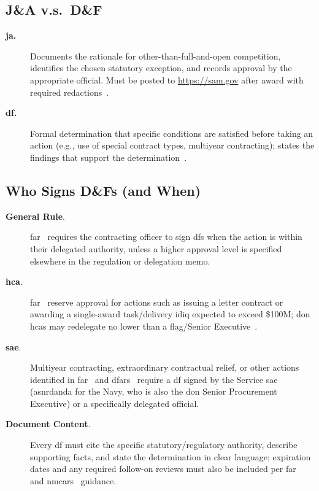 \documentclass[../main.tex]{subfiles}
\begin{document}
\subsection{J\&A v.s.\ D\&F}
\begin{description}
  \item[\textbf{\ac{ja}.}] Documents the rationale for other-than-full-and-open competition, identifies the chosen statutory exception, and records approval by the appropriate official. Must be posted to \url{https://sam.gov} after award with required redactions~\autocite{FAR}.
  \item[\textbf{\ac{df}.}] Formal determination that specific conditions are satisfied before taking an action (e.g., use of special contract types, multiyear contracting); states the findings that support the determination~\autocite{FAR}.
\end{description}

\subsection{Who Signs D\&Fs (and When)}
\begin{description}
  \item[\textbf{General Rule}.] \ac{far}~\autocite[\S~1.704]{FAR} requires the contracting officer to sign \acp{df} when the action is within their delegated authority, unless a higher approval level is specified elsewhere in the regulation or delegation memo.
  \item[\textbf{\ac{hca}}.] \ac{far}~\autocite[\S\S~16.603-3, 16.504(c)(1)(ii)(D)]{FAR} reserve approval for actions such as issuing a letter contract or awarding a single-award task/delivery \ac{idiq} expected to exceed \$100M; \ac{don} \acp{hca} may redelegate no lower than a flag/Senior Executive~\autocite[\S~5201.707]{NMCARS}.
  \item[\textbf{\ac{sae}}.] Multiyear contracting, extraordinary contractual relief, or other actions identified in \ac{far}~\autocite[\S~17.105-1]{FAR} and \ac{dfars}~\autocite[\S~217.172]{DFARS} require a \ac{df} signed by the Service \ac{sae} (\ac{asnrdanda} for the Navy, who is also the \ac{don} Senior Procurement Executive) or a specifically delegated official.
  \item[\textbf{Document Content}.] Every \ac{df} must cite the specific statutory/regulatory authority, describe supporting facts, and state the determination in clear language; expiration dates and any required follow-on reviews must also be included per \ac{far}~\autocite[\S~1.707]{FAR} and \ac{nmcars}~\autocite[\S~5201.707]{NMCARS} guidance.
\end{description}
\end{document}
